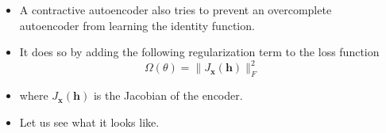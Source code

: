 
\begin{frame}
\end{frame}


\begin{frame}
  \begin{columns}
    \begin{overlayarea}{\textwidth}{\textheight}
        \begin{itemize}[]\justifying
            \item<1-> A contractive autoencoder also tries to prevent an overcomplete autoencoder from learning the identity function.
            \item<2-> It does so by adding the following regularization term to the loss function\\
            \[
                \Omega(\theta) = \|J_{\textbf{x}}(\mathbf{h})\|_F^2
            \]
            \item<3->[] where $J_{\textbf{x}}(\mathbf{h})$ is the Jacobian of the encoder.
            \item<4-> Let us see what it looks like.
        \end{itemize}
    \end{overlayarea}

    \begin{overlayarea}{\textwidth}{\textheight}
    \end{overlayarea}
  \end{columns}
\end{frame}

